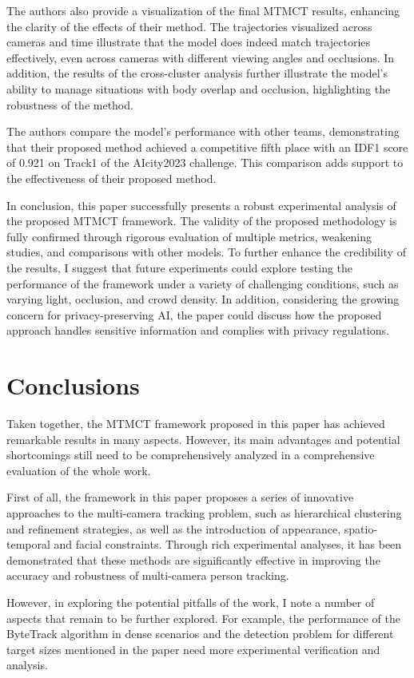 \documentclass[a4paper,10pt,conference]{COMP9517}
\begin{document}
The authors also provide a visualization of the final MTMCT results, enhancing the clarity of the effects of their method. The trajectories visualized across cameras and time illustrate that the model does indeed match trajectories effectively, even across cameras with different viewing angles and occlusions. In addition, the results of the cross-cluster analysis further illustrate the model's ability to manage situations with body overlap and occlusion, highlighting the robustness of the method.

The authors compare the model's performance with other teams, demonstrating that their proposed method achieved a competitive fifth place with an IDF1 score of 0.921 on Track1 of the AIcity2023 challenge. This comparison adds support to the effectiveness of their proposed method.

In conclusion, this paper successfully presents a robust experimental analysis of the proposed MTMCT framework. The validity of the proposed methodology is fully confirmed through rigorous evaluation of multiple metrics, weakening studies, and comparisons with other models. To further enhance the credibility of the results, I suggest that future experiments could explore testing the performance of the framework under a variety of challenging conditions, such as varying light, occlusion, and crowd density. In addition, considering the growing concern for privacy-preserving AI, the paper could discuss how the proposed approach handles sensitive information and complies with privacy regulations.


\section{Conclusions}
Taken together, the MTMCT framework proposed in this paper has achieved remarkable results in many aspects. However, its main advantages and potential shortcomings still need to be comprehensively analyzed in a comprehensive evaluation of the whole work.

First of all, the framework in this paper proposes a series of innovative approaches to the multi-camera tracking problem, such as hierarchical clustering and refinement strategies, as well as the introduction of appearance, spatio-temporal and facial constraints. Through rich experimental analyses, it has been demonstrated that these methods are significantly effective in improving the accuracy and robustness of multi-camera person tracking.

However, in exploring the potential pitfalls of the work, I note a number of aspects that remain to be further explored. For example, the performance of the ByteTrack algorithm in dense scenarios and the detection problem for different target sizes mentioned in the paper need more experimental verification and analysis.
\end{document}
